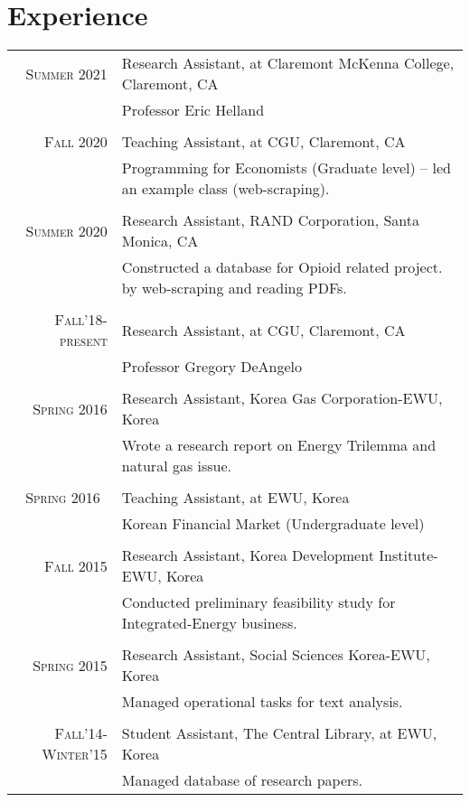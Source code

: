 \documentclass[a4paper,10pt]{article}
\begin{document}
\section{Experience}
\begin{tabular}{r|p{11cm}}
\\\textsc{Summer 2021} & Research Assistant, at Claremont McKenna College, Claremont, CA\\&\footnotesize{Professor Eric Helland}\\\multicolumn{2}{c}{}
\\\textsc{Fall 2020} & Teaching Assistant, at CGU, Claremont, CA\\&\footnotesize{Programming for Economists (Graduate level) -- led an example class (web-scraping).}\\\multicolumn{2}{c}{}\\\textsc{Summer 2020} & Research Assistant, RAND
Corporation, Santa Monica, CA\\&\footnotesize{Constructed a database for Opioid related project. by web-scraping and reading PDFs.}\\\multicolumn{2}{c}{}
\\\textsc{Fall'18-present} & Research Assistant, at CGU, Claremont, CA \\&\footnotesize{Professor Gregory DeAngelo}\\\multicolumn{2}{c}{}\\
\textsc{Spring 2016} & Research Assistant, Korea Gas Corporation-EWU, Korea\\&\footnotesize{Wrote a research report on Energy Trilemma and natural gas issue.}
\\\multicolumn{2}{c}{} \\\textsc{Spring 2016}\ & Teaching Assistant, at EWU, Korea \\&\footnotesize{Korean Financial Market (Undergraduate level)}
\\\multicolumn{2}{c}{} \\
\textsc{Fall 2015} & Research Assistant, Korea Development Institute-EWU, Korea \\&\footnotesize{Conducted preliminary feasibility study for Integrated-Energy business.}\\\multicolumn{2}{c}{} \\
\textsc{Spring 2015} & Research Assistant, Social Sciences Korea-EWU, Korea\\&\footnotesize{Managed operational tasks for text analysis.}\\\multicolumn{2}{c}{} \\
\textsc{Fall'14-Winter'15} & Student Assistant, The Central Library, at EWU, Korea \\&\footnotesize{Managed database of research papers.}\\

\end{tabular}
\end{document}
